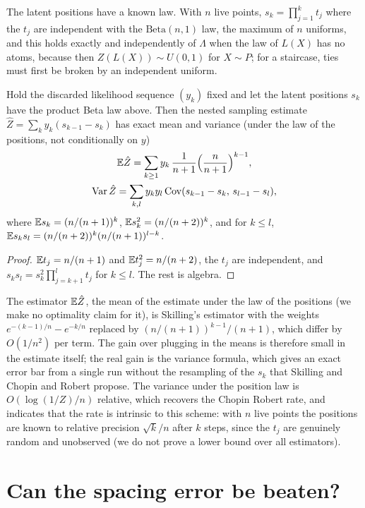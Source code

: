 The latent positions have a known law. With $n$ live points, $s_k = \prod_{j=1}^{k} t_j$ where the $t_j$ are independent with the $\mathrm{Beta}(n, 1)$ law, the maximum of $n$ uniforms, and this holds exactly and independently of $\Lambda$ when the law of $L(X)$ has no atoms, because then $Z(L(X)) \sim U(0,1)$ for $X \sim P$; for a staircase, ties must first be broken by an independent uniform.

\begin{theorem}
\label{thm:nestedmoments}
Hold the discarded likelihood sequence $(y_k)$ fixed and let the latent positions $s_k$ have the product Beta law above. Then the nested sampling estimate $\hat Z = \sum_k y_k (s_{k-1} - s_k)$ has exact mean and variance (under the law of the positions, not conditionally on $y$)
\[
\begin{gathered}
\mathbb{E} \hat Z = \sum_{k \ge 1} y_k \, \frac{1}{n+1} \Big( \frac{n}{n+1} \Big)^{k-1} , \\
\operatorname{Var} \hat Z = \sum_{k, l} y_k y_l \, \mathrm{Cov}(s_{k-1} - s_k, \, s_{l-1} - s_l) ,
\end{gathered}
\]
where $\mathbb{E} s_k = (n/(n+1))^k$, $\mathbb{E} s_k^2 = (n/(n+2))^k$, and for $k \le l$, $\mathbb{E} s_k s_l = (n/(n+2))^k (n/(n+1))^{l-k}$.
\end{theorem}

\begin{proof}
$\mathbb{E} t_j = n/(n+1)$ and $\mathbb{E} t_j^2 = n/(n+2)$, the $t_j$ are independent, and $s_k s_l = s_k^2 \prod_{j=k+1}^{l} t_j$ for $k \le l$. The rest is algebra.
\end{proof}

The estimator $\mathbb{E} \hat Z$, the mean of the estimate under the law of the positions (we make no optimality claim for it), is Skilling's estimator with the weights $e^{-(k-1)/n} - e^{-k/n}$ replaced by $(n/(n+1))^{k-1} / (n+1)$, which differ by $O(1/n^2)$ per term. The gain over plugging in the means is therefore small in the estimate itself; the real gain is the variance formula, which gives an exact error bar from a single run without the resampling of the $s_k$ that Skilling and Chopin and Robert propose. The variance under the position law is $O(\log(1/Z)/n)$ relative, which recovers the Chopin Robert rate, and indicates that the rate is intrinsic to this scheme: with $n$ live points the positions are known to relative precision $\sqrt{k}/n$ after $k$ steps, since the $t_j$ are genuinely random and unobserved (we do not prove a lower bound over all estimators).

\section{Can the spacing error be beaten?}

